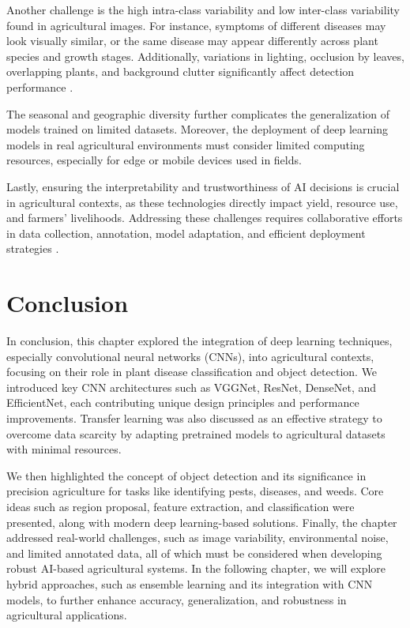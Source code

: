 Another challenge is the high intra-class variability and low inter-class variability found in agricultural images. For instance, symptoms of different diseases may look visually similar, or the same disease may appear differently across plant species and growth stages. Additionally, variations in lighting, occlusion by leaves, overlapping plants, and background clutter significantly affect detection performance \parencite{alzubaidi2021review}.

The seasonal and geographic diversity further complicates the generalization of models trained on limited datasets. Moreover, the deployment of deep learning models in real agricultural environments must consider limited computing resources, especially for edge or mobile devices used in fields.

Lastly, ensuring the interpretability and trustworthiness of AI decisions is crucial in agricultural contexts, as these technologies directly impact yield, resource use, and farmers’ livelihoods. Addressing these challenges requires collaborative efforts in data collection, annotation, model adaptation, and efficient deployment strategies \parencite{alzubaidi2021review}.

\section{Conclusion}
In conclusion, this chapter explored the integration of deep learning techniques, especially convolutional neural networks (CNNs), into agricultural contexts, focusing on their role in plant disease classification and object detection. We introduced key CNN architectures such as VGGNet, ResNet, DenseNet, and EfficientNet, each contributing unique design principles and performance improvements. Transfer learning was also discussed as an effective strategy to overcome data scarcity by adapting pretrained models to agricultural datasets with minimal resources.

We then highlighted the concept of object detection and its significance in precision agriculture for tasks like identifying pests, diseases, and weeds. Core ideas such as region proposal, feature extraction, and classification were presented, along with modern deep learning-based solutions. Finally, the chapter addressed real-world challenges, such as image variability, environmental noise, and limited annotated data, all of which must be considered when developing robust AI-based agricultural systems. In the following chapter, we will explore hybrid approaches, such as ensemble learning and its integration with CNN models, to further enhance accuracy, generalization, and robustness in agricultural applications.

